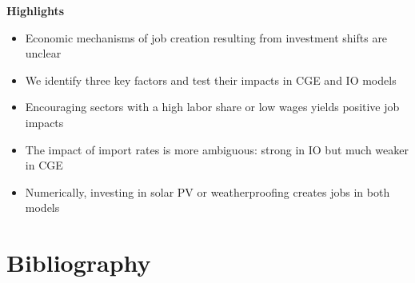 \documentclass[1p]{elsarticle}
\begin{document}
\textbf{Highlights}
\begin{itemize}
	\itemsep-0.5em 
	\item Economic mechanisms of job creation resulting from investment shifts are unclear
	\item We identify three key factors and test their impacts in CGE and IO models
	\item Encouraging sectors with a high labor share or low wages yields positive job impacts
	\item The impact of import rates is more ambiguous: strong in IO but much weaker in CGE
	\item Numerically, investing in solar PV or weatherproofing creates jobs in both models
\end{itemize}

\cleardoublepage




\cleardoublepage

\section*{Bibliography}
 

\cleardoublepage


\begin{spacing}{01} 
	
	\begin{appendices}
		
	\end{appendices}
	
\end{spacing}
\end{document}
